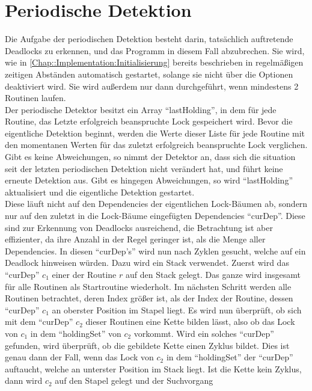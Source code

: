 \section{Periodische Detektion} \label{Chap::Implementation:Periodic}
Die Aufgabe der periodischen Detektion besteht darin, tatsächlich auftretende
Deadlocks zu erkennen, und das Programm in diesem Fall abzubrechen. Sie wird,
wie in \ref{Chap::Implementation:Initialisierung} bereits beschrieben in 
regelmäßigen zeitigen Abständen automatisch gestartet, solange sie nicht 
über die Optionen deaktiviert wird. Sie wird außerdem nur dann durchgeführt,
wenn mindestens 2 Routinen laufen.\\
Der periodische Detektor besitzt ein Array ``lastHolding'', in dem für jede 
Routine, das Letzte erfolgreich beanspruchte Lock gespeichert wird. Bevor 
die eigentliche Detektion beginnt, werden die Werte dieser Liste für jede 
Routine mit den momentanen Werten für das zuletzt erfolgreich beanspruchte 
Lock verglichen. Gibt es keine Abweichungen, so nimmt der Detektor an, dass sich 
die situation seit der letzten periodischen Detektion nicht verändert hat, und 
führt keine erneute Detektion aus. Gibt es hingegen Abweichungen, so wird 
``lastHolding'' aktualisiert und die eigentliche Detektion gestartet.\\
Diese läuft nicht auf den Dependencies der eigentlichen Lock-Bäumen ab, 
sondern nur auf den zuletzt in die 
Lock-Bäume eingefügten Dependencies ``curDep''. Diese sind zur Erkennung von
Deadlocks ausreichend, die Betrachtung ist aber effizienter, da ihre Anzahl in 
der Regel geringer ist, als die Menge aller Dependencies. In diesen ``curDep's''
wird nun nach Zyklen gesucht, welche auf ein Deadlock hinweisen würden.
Dazu wird ein Stack verwendet. Zuerst wird das ``curDep'' $c_1$ einer der 
Routine $r$
auf den Stack gelegt. Das ganze wird insgesamt für alle Routinen als 
Startroutine wiederholt. Im nächsten Schritt werden alle Routinen betrachtet,
deren Index größer ist, als der Index der Routine, dessen ``curDep'' $c_1$ an 
oberster
Position im Stapel liegt. Es wird nun überprüft, ob sich mit dem ``curDep''
 $c_2$ dieser 
Routinen eine Kette bilden lässt, also ob das Lock von $c_1$ in dem 
``holdingSet'' von $c_2$ vorkommt. Wird ein solches 
``curDep'' gefunden, wird überprüft, ob die gebildete Kette einen Zyklus bildet.
Dies ist genau dann der Fall, wenn das Lock von $c_2$ in dem ``holdingSet''
der ``curDep'' auftaucht, welche an unterster Position im Stack liegt. Ist 
die Kette kein Zyklus, dann wird $c_2$ auf den Stapel gelegt und der Suchvorgang

